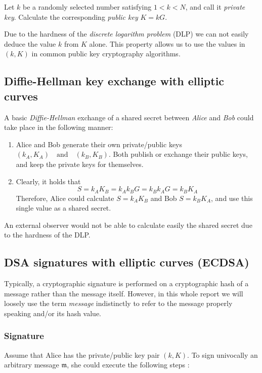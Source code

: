 Let \(k\) be a randomly selected number satisfying \(1 < k < N\), and call it {\em private key}. 
Calculate the corresponding {\em public key} \(K = k G\). 

Due to the hardness of the {\em discrete logarithm problem} (DLP) we can not easily deduce the value \(k\) from \(K\) alone.
This property allows us to use the values in \( (k, K) \) in common public key cryptography algorithms.


\subsection{Diffie-Hellman key exchange with elliptic curves}
A basic {\em Diffie-Hellman} exchange of a shared secret between {\em Alice} and {\em Bob}  could take place in the following manner:

\begin{enumerate}
	
	\item Alice and Bob generate their own private/public keys \((k_A, K_A) \quad \textrm{and} \quad (k_B, K_B)\). Both publish or exchange their public keys, and keep the private keys for themselves.
	
	\item Clearly, it holds that \[S = k_A K_B = k_A k_B G = k_B k_A G = k_B K_A\]
	 Therefore, Alice could calculate \(S = k_A K_B\) and Bob \(S = k_B K_A\),  and use this single value as a shared secret.
	
\end{enumerate}   

An external observer would not be able to calculate easily the shared secret due to the hardness of the DLP.


\subsection{DSA signatures with elliptic curves (ECDSA)}

Typically, a cryptographic signature is performed on a cryptographic hash of a message rather than the message itself.
However, in this whole report we will loosely use the term {\em message} indistinctly to refer to the message properly speaking and/or its hash value.

\subsubsection*{Signature}

Assume that Alice has the private/public key pair \((k, K)\). To sign univocally an arbitrary message \(\mathfrak{m}\), she could execute the following steps \cite{Hankerson:2003:GEC:940321}:

